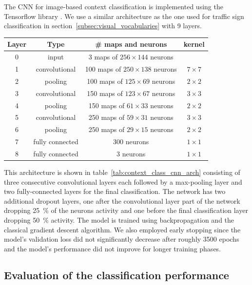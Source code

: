 The \ac{CNN} for image-based context classification is implemented using the Tensorflow library \parencite{Abadi2016}.
We use a similar architecture as the one used for traffic sign classification in section~\ref{subsec:visual_vocabularies} with \num{9} layers.
\begin{center}
    \begin{tabular}{c|c|c|c}
         Layer & Type & \# maps and neurons & kernel \\
		\hline
         0 & input & \num{3} maps of $256 \times 144$ neurons & \\ 
         1 & convolutional & \num{100} maps of $250 \times 138$ neurons & $7 \times 7$ \\
         2 & pooling & \num{100} maps of $125 \times 69$ neurons & $2 \times 2$ \\
         3 & convolutional & \num{150} maps of $123 \times 67$ neurons & $3 \times 3$ \\
         4 & pooling & \num{150} maps of $61 \times 33$ neurons & $2 \times 2$ \\
         5 & convolutional & \num{250} maps of $59 \times 31$ neurons & $3 \times 3$ \\
         6 & pooling & \num{250} maps of $29 \times 15$ neurons & $2 \times 2$ \\
         7 & fully connected & \num{300} neurons & $1 \times 1$ \\
         8 & fully connected & \num{3} neurons & $1 \times 1$ 
    \end{tabular}
	\label{tab:context_class_cnn_arch}
\end{center}
This architecture is shown in table~\ref{tab:context_class_cnn_arch} consisting of three consecutive convolutional layers each followed by a max-pooling layer and two fully-connected layers for the final classification.
The network has two additional dropout layers, one after the convolutional layer part of the network dropping \SI{25}{\percent} of the neurons activity and one before the final classification layer dropping \SI{50}{\percent} activity.
The model is trained using backpropagation and the classical gradient descent algorithm.
We also employed early stopping since the model's validation loss did not significantly decrease after roughly \num{3500} epochs and the model's performance did not improve for longer training phases.

\subsection{Evaluation of the classification performance}%
\label{subsec:evaluation_of_the_classification_performance}

